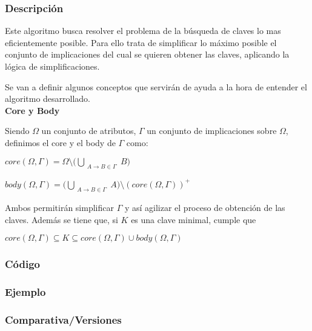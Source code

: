 \subsubsection{Descripci\'on} 
Este algoritmo busca resolver el problema de la b\'usqueda de claves lo mas eficientemente posible. Para ello trata de simplificar lo m\'aximo posible el conjunto de implicaciones del cual se quieren obtener las claves, aplicando la l\'ogica de simplificaciones.

Se van a definir algunos conceptos que servir\'an de ayuda a la hora de entender el algoritmo desarrollado.\\

\textbf{Core y Body}

Siendo \(\Omega\) un conjunto de atributos, \(\Gamma\) un conjunto de implicaciones sobre \(\Omega\), definimos el core y el body de \(\Gamma\) como:
\begin{center}
    \(core(\Omega,\Gamma) = \Omega \setminus \big(\bigcup_{\substack{A \to B \in \Gamma}} B\big)\)

    \(body(\Omega,\Gamma) = \big(\bigcup_{\substack{A \to B \in \Gamma}} A\big) \setminus (core(\Omega,\Gamma))^+\)
\end{center}
Ambos permitir\'an simplificar \(\Gamma\) y as\'i agilizar el proceso de obtenci\'on de las claves. Adem\'as se tiene que, si \(K\) es una clave minimal, cumple que 
\begin{center}
    \(core(\Omega,\Gamma) \subseteq K \subseteq core(\Omega,\Gamma) \cup body(\Omega,\Gamma)\)
\end{center}
\newpage
\subsubsection{C\'odigo} 

\newpage
\subsubsection{Ejemplo} 
\subsubsection{Comparativa/Versiones} 